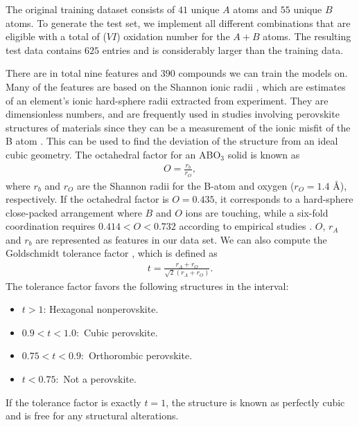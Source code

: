 The original training dataset consists of $41$ unique $A$ atoms and $55$ unique $B$ atoms. To generate the test set, we implement all different combinations that are eligible with a total of ($VI$) oxidation number for the $A+B$ atoms. The resulting test data contains $625$ entries and is considerably larger than the training data.


There are in total nine features and $390$ compounds we can train the models on. Many of the features are based on the Shannon ionic radii \cite{Shannon1976}, which are estimates of an element's ionic hard-sphere radii extracted from experiment. They are dimensionless numbers, and are frequently used in studies involving perovskite structures of materials since they can be a measurement of the ionic misfit of the B atom \cite{Shannon1976}. This can be used to find the deviation of the structure from an ideal cubic geometry. The octahedral factor for an ABO$_3$ solid is known as
\begin{align}
  O = \frac{r_b}{r_O},
\end{align}
where $r_b$ and $r_O$ are the Shannon radii for the B-atom and oxygen ($r_O = 1.4$ $\text{\AA}$), respectively. If the octahedral factor is $O=0.435$, it corresponds to a hard-sphere close-packed arrangement where $B$ and $O$ ions are touching, while a six-fold coordination requires $0.414 < O < 0.732$ according to empirical studies \cite{Zhang2007}. $O$, $r_A$ and $r_b$ are represented as features in our data set. We can also compute the Goldschmidt tolerance factor \cite{Goldschmidt1926}, which is defined as
\begin{align}
  t = \frac{r_A + r_O}{\sqrt{2}(r_A+r_O)}.
\end{align}
\noindent The tolerance factor favors the following structures in the interval:
\begin{itemize}
  \item $t>1$: Hexagonal nonperovskite.
  \item $0.9 < t < 1.0:$ Cubic perovskite.
  \item $0.75 < t < 0.9:$ Orthorombic perovskite.
  \item $t < 0.75:$ Not a perovskite.
\end{itemize}
\noindent If the tolerance factor is exactly $t=1$, the structure is known as perfectly cubic and is free for any structural alterations.

